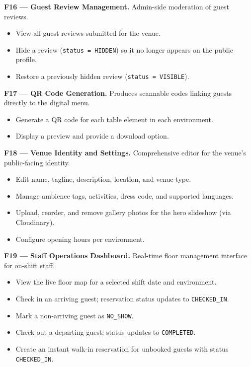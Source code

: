 \documentclass[12pt,a4paper,oneside]{report}
\begin{document}
\textbf{F16 --- Guest Review Management.}
Admin-side moderation of guest reviews.
\begin{itemize}[leftmargin=1.5em, topsep=2pt, itemsep=1pt]
  \item View all guest reviews submitted for the venue.
  \item Hide a review (\texttt{status = HIDDEN}) so it no longer appears
        on the public profile.
  \item Restore a previously hidden review (\texttt{status = VISIBLE}).
\end{itemize}

\textbf{F17 --- QR Code Generation.}
Produces scannable codes linking guests directly to the digital menu.
\begin{itemize}[leftmargin=1.5em, topsep=2pt, itemsep=1pt]
  \item Generate a QR code for each table element in each environment.
  \item Display a preview and provide a download option.
\end{itemize}

\textbf{F18 --- Venue Identity and Settings.}
Comprehensive editor for the venue's public-facing identity.
\begin{itemize}[leftmargin=1.5em, topsep=2pt, itemsep=1pt]
  \item Edit name, tagline, description, location, and venue type.
  \item Manage ambience tags, activities, dress code, and supported
        languages.
  \item Upload, reorder, and remove gallery photos for the hero slideshow
        (via Cloudinary).
  \item Configure opening hours per environment.
\end{itemize}

\textbf{F19 --- Staff Operations Dashboard.}
Real-time floor management interface for on-shift staff.
\begin{itemize}[leftmargin=1.5em, topsep=2pt, itemsep=1pt]
  \item View the live floor map for a selected shift date and environment.
  \item Check in an arriving guest; reservation status updates to
        \texttt{CHECKED\_IN}.
  \item Mark a non-arriving guest as \texttt{NO\_SHOW}.
  \item Check out a departing guest; status updates to \texttt{COMPLETED}.
  \item Create an instant walk-in reservation for unbooked guests with
        status \texttt{CHECKED\_IN}.
\end{itemize}
\end{document}
